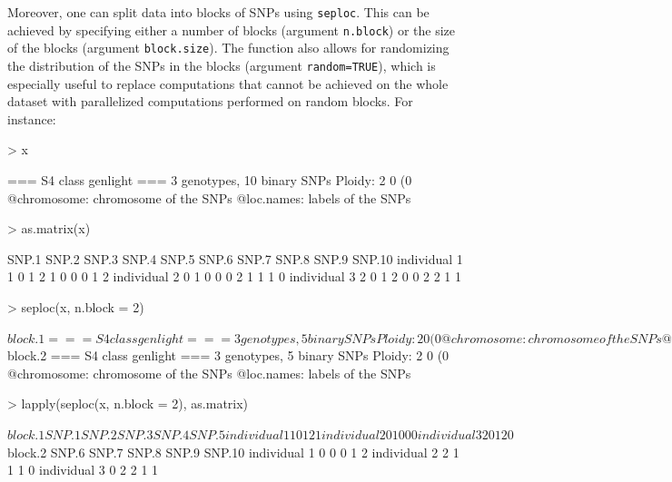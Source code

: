 \documentclass{article}
\begin{document}
Moreover, one can split data into blocks of SNPs using \texttt{seploc}.
This can be achieved by specifying either a number of blocks (argument \texttt{n.block}) or the size
of the blocks (argument \texttt{block.size}). The function also allows for randomizing the
distribution of the SNPs in the blocks (argument \texttt{random=TRUE}), which is especially useful
to replace computations that cannot be achieved on the whole dataset with parallelized computations performed on random blocks.
For instance:
\begin{Schunk}
\begin{Sinput}
> x
\end{Sinput}
\begin{Soutput}
 === S4 class genlight ===
 3 genotypes,  10 binary SNPs
 Ploidy: 2
 0 (0 %
 @chromosome: chromosome of the SNPs
 @loc.names: labels of the SNPs
\end{Soutput}
\begin{Sinput}
> as.matrix(x)
\end{Sinput}
\begin{Soutput}
             SNP.1 SNP.2 SNP.3 SNP.4 SNP.5 SNP.6 SNP.7 SNP.8 SNP.9 SNP.10
individual 1     1     0     1     2     1     0     0     0     1      2
individual 2     0     1     0     0     0     2     1     1     1      0
individual 3     2     0     1     2     0     0     2     2     1      1
\end{Soutput}
\begin{Sinput}
> seploc(x, n.block = 2)
\end{Sinput}
\begin{Soutput}
$block.1
 === S4 class genlight ===
 3 genotypes,  5 binary SNPs
 Ploidy: 2
 0 (0 %
 @chromosome: chromosome of the SNPs
 @loc.names: labels of the SNPs

$block.2
 === S4 class genlight ===
 3 genotypes,  5 binary SNPs
 Ploidy: 2
 0 (0 %
 @chromosome: chromosome of the SNPs
 @loc.names: labels of the SNPs
\end{Soutput}
\begin{Sinput}
> lapply(seploc(x, n.block = 2), as.matrix)
\end{Sinput}
\begin{Soutput}
$block.1
             SNP.1 SNP.2 SNP.3 SNP.4 SNP.5
individual 1     1     0     1     2     1
individual 2     0     1     0     0     0
individual 3     2     0     1     2     0

$block.2
             SNP.6 SNP.7 SNP.8 SNP.9 SNP.10
individual 1     0     0     0     1      2
individual 2     2     1     1     1      0
individual 3     0     2     2     1      1
\end{Soutput}
\end{Schunk}
\end{document}
